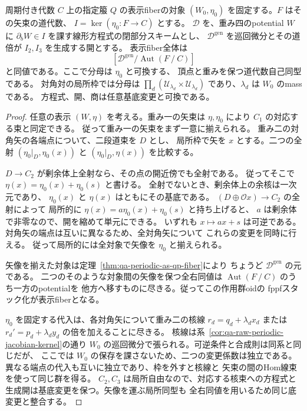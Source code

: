 \begin{proposition}[固定した矢像による周期付き表示fiberの商]
\label{prop:qa-fixed-arrow-presentation-fiber}
周期付き代数 $C$ 上の指定箙 $Q$ の表示fiberの対象
$(W_0,\eta_0)$ を固定する。$F$ はその矢束の道代数、
$I=\ker(\eta_0:F\to C)$ とする。
$\mathscr D$ を、重み四のpotential $W$ に
$\partial_b W\in I$ を課す線形方程式の閉部分スキームとし、
$\mathscr D^{\mathrm{gen}}$ を巡回微分とその道倍が
$I_2,I_3$ を生成する開とする。
表示fiber全体は
\[
 [\mathscr D^{\mathrm{gen}}/\operatorname{Aut}(F\mathbin{/} C)]
\]
と同値である。ここで分母は $\eta_0$ と可換する、
頂点と重みを保つ道代数自己同型である。
対角対の局所枠では分母は
$\prod_d(\mathcal U_{\lambda_d}\times\mathcal U_{\lambda_d})$
であり、$\lambda_d$ は $W_0$ のmassである。
方程式、開、商は任意基底変更と可換である。
\end{proposition}
\begin{proof}
任意の表示 $(W,\eta)$ を考える。重み一の矢束は
$\eta,\eta_0$ により $C_1$ の対応する束と同定できる。
従って重み一の矢束をまず一意に揃えられる。
重み二の対角矢の各端点について、二段道束を $D$ とし、
局所枠で矢を $x$ とする。二つの全射
$(\eta_0|_D,\eta_0(x))$ と $(\eta_0|_D,\eta(x))$ を比較する。

$D\to C_2$ が剰余体上全射なら、その点の開近傍でも全射である。
従ってそこで $\eta(x)=\eta_0(x)+\eta_0(s)$ と書ける。
全射でないとき、剰余体上の余核は一次元であり、
$\eta_0(x)$ と $\eta(x)$ はともにその基底である。
$(D\oplus\mathcal O x)\to C_2$ の全射によって
局所的に $\eta(x)=a\eta_0(x)+\eta_0(s)$ と持ち上げると、
$a$ は剰余体で非零なので、開を縮めて単元にできる。
いずれも $x\mapsto ax+s$ は可逆である。
対角矢の端点は互いに異なるため、全対角矢について
これらの変更を同時に行える。
従って局所的には全対象で矢像を $\eta_0$ と揃えられる。

矢像を揃えた対象は定理~\ref{thm:qa-periodic-as-qp-fiber}により
ちょうど $\mathscr D^{\mathrm{gen}}$ の元である。
二つのそのような対象間の矢像を保つ全右同値は
$\operatorname{Aut}(F\mathbin{/} C)$ のうち一方のpotentialを
他方へ移すものに尽きる。従ってこの作用群oidの
fppfスタック化が表示fiberとなる。

$\eta_0$ を固定する代入は、各対角矢について重み二の核線
$r_d=q_d+\lambda_d x_d$ または
$r_d'=p_d+\lambda_d y_d$ の倍を加えることに尽きる。
核線は系~\ref{cor:qa-raw-periodic-jacobian-kernel}の通り
$W_0$ の巡回微分で張られる。可逆条件と合成則は同系と同じだが、
ここでは $W_0$ の保存を課さないため、二つの変更係数は独立である。
異なる端点の代入も互いに独立であり、枠を外すと核線と
矢束の間のHom線束を使って同じ群を得る。
$C_2,C_3$ は局所自由なので、対応する核束への方程式と
生成開は基底変更を保つ。矢像を運ぶ局所同型も
全右同値を用いるため同じ底変更と整合する。
\end{proof}

